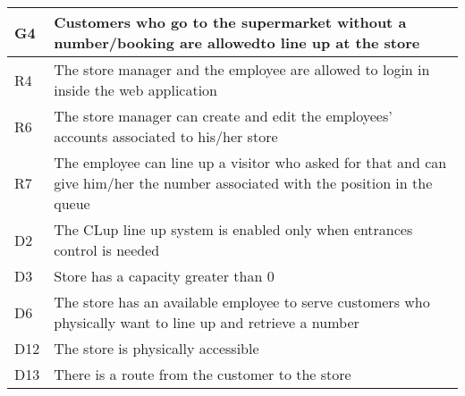 \begin{center}
        {\renewcommand{\arraystretch}{1.5}
        \begin{longtable}{L{2cm}L{12cm}}
            \hline
            \textbf{G4} & \textbf{Customers who go to the supermarket without a number/booking are allowedto line up at the store} \\
            \hline
             R4 & The store manager and the employee are allowed to login in inside the web application \\
            \hline
             R6 & The store manager can create and edit the employees’ accounts associated to his/her store \\
            \hline
             R7 & The employee can line up a visitor who asked for that and can give him/her the number associated with the position in the queue \\
            \hline
             D2 & The CLup line up system is enabled only when entrances control is needed \\
            \hline
             D3 & Store has a capacity greater than 0 \\
            \hline
             D6 & The store has an available employee to serve customers who physically want to line up and retrieve a number \\
            \hline
             D12 & The store is physically accessible \\
            \hline
             D13 & There is a route from the customer to the store \\
            \hline
        \end{longtable}}


\end{center}

